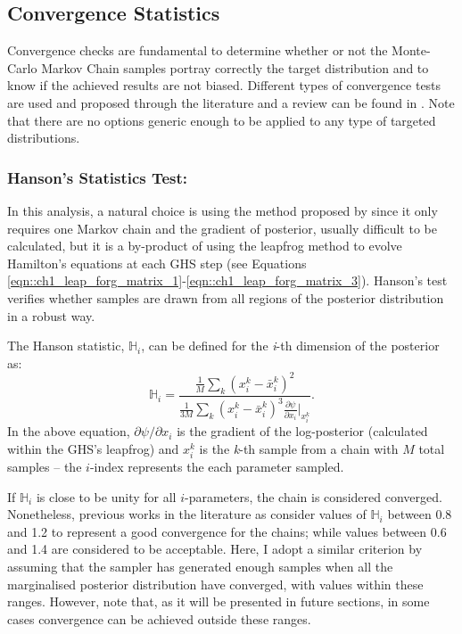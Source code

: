 \subsection{Convergence Statistics}\label{Sec:BPL:Convergence}
Convergence checks are fundamental to determine whether or not the Monte-Carlo Markov Chain samples portray correctly the target distribution and to know if the achieved results are not biased. Different types of convergence tests are used and proposed through the literature and a review can be found in \cite{2017Deonovic}. Note that there are no options generic enough to be applied to any type of targeted distributions.

\subsubsection{Hanson's Statistics Test:}
In this analysis, a natural choice is using the method proposed by \cite{Hanson2001} since it only requires one Markov chain and the gradient of posterior, usually difficult to be calculated, but it is a by-product of using the leapfrog method to evolve Hamilton's equations at each GHS step (see Equations \eqref{eqn::ch1_leap_forg_matrix_1}-\eqref{eqn::ch1_leap_forg_matrix_3}). Hanson's test verifies whether samples are drawn from all regions of the posterior distribution in a robust way. 

\qquad The Hanson statistic, $\mathbb{H}_i$, can be defined for the \textit{i}-th dimension of the posterior as:
\begin{equation}
 \mathbb{H}_i=\frac{\frac{1}{M}\sum_k\left(x_i^k-\bar{x}_i^k\right)^2}{ \frac{1}{3M}\sum_k\left(x_i^k-\bar{x}_i^k\right)^3\frac{\partial\psi}{\partial x_i}\Big|_{x_i^k} }.
 \end{equation}
In the above equation, $\partial\psi/\partial x_i$ is the gradient of the log-posterior (calculated within the GHS's leapfrog) and $x_i^k$ is the \textit{k}-th sample from a chain with $M$ total samples -- the $i$-index represents the each parameter sampled.

\qquad If $\mathbb{H}_i$ is close to be unity for all $i$-parameters, the chain is considered converged. Nonetheless, previous works in the literature as \cite{Taylor2008} consider values of $\mathbb{H}_i$ between 0.8 and 1.2 to represent a good convergence for the chains; while values between 0.6 and 1.4 are considered to be acceptable. Here, I adopt a similar criterion by assuming that the sampler has generated enough samples when all the marginalised posterior distribution have converged, with values within these ranges. However, note that, as it will be presented in future sections, in some cases convergence can be achieved outside these ranges.

